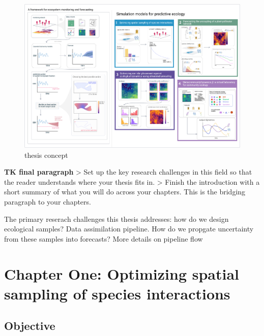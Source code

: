 \documentclass[11pt]{article}
\makeatletter
\def\maxwidth{\ifdim\Gin@nat@width>\linewidth\linewidth
\else\Gin@nat@width\fi}
\let\Oldincludegraphics\includegraphics
\renewcommand{\includegraphics}[1]{\Oldincludegraphics[width=\maxwidth]{#1}}
\makeatother
\begin{document}
\begin{figure}
\hypertarget{fig:thesis}{%
\centering
\includegraphics{./figures/thesisconcept.png}
\caption{thesis concept}\label{fig:thesis}
}
\end{figure}

\textbf{TK final paragraph} \textgreater{} Set up the key research
challenges in this field so that the reader understands where your
thesis fits in. \textgreater{} Finish the introduction with a short
summary of what you will do across your chapters. This is the bridging
paragraph to your chapters.

The primary reserach challenges this thesis addresses: how do we design
ecological samples? Data assimilation pipeline. How do we propgate
uncertainty from these samples into forecasts? More details on pipeline
flow

\hypertarget{chapter-one-optimizing-spatial-sampling-of-species-interactions}{%
\section{Chapter One: Optimizing spatial sampling of species
interactions}\label{chapter-one-optimizing-spatial-sampling-of-species-interactions}}

\hypertarget{objective}{%
\subsection{Objective}\label{objective}}
\end{document}
